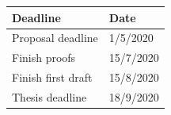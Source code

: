 \documentclass[12pt, final]{article}
\begin{document}

\begin{center}
  \begin{tabular}{ | m{5cm} | m{5cm} | }
    \hline
    Deadline          & Date  \\
    \hline
    Proposal deadline & 1/5/2020 \\
    Finish proofs & 15/7/2020 \\
    Finish first draft & 15/8/2020 \\
    Thesis deadline & 18/9/2020 \\
    \hline
  \end{tabular}
\end{center}

\printbibliography
\makeatother
\end{document}
